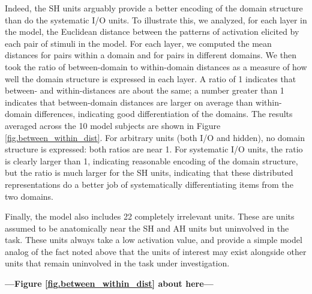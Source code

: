 Indeed, the SH units arguably provide a better encoding of the domain structure than do the systematic I/O units. To illustrate this, we analyzed, for each layer in the model, the Euclidean distance between the patterns of activation elicited by each pair of stimuli in the model. For each layer, we computed the mean distances for pairs within a domain and for pairs in different domains. We then took the ratio of between-domain to within-domain distances as a measure of how well the domain structure is expressed in each layer. A ratio of 1 indicates that between- and within-distances are about the same; a number greater than 1 indicates that between-domain distances are larger on average than within-domain differences, indicating good differentiation of the domains. The results averaged across the 10 model subjects are shown in Figure \ref{fig.between_within_dist}. For arbitrary units (both I/O and hidden), no domain structure is expressed: both ratios are near 1. For systematic I/O units, the ratio is clearly larger than 1, indicating reasonable encoding of the domain structure, but the ratio is much larger for the SH units, indicating that these distributed representations do a better job of systematically differentiating items from the two domains.


Finally, the model also includes 22 completely irrelevant units. These are units assumed to be anatomically near the SH and AH units but uninvolved in the task. These units always take a low activation value, and provide a simple model analog of the fact noted above that the units of interest may exist alongside other units that remain uninvolved in the task under investigation.

\begin{center}
\textbf{---Figure \ref{fig.between_within_dist} about here---}
\end{center}

